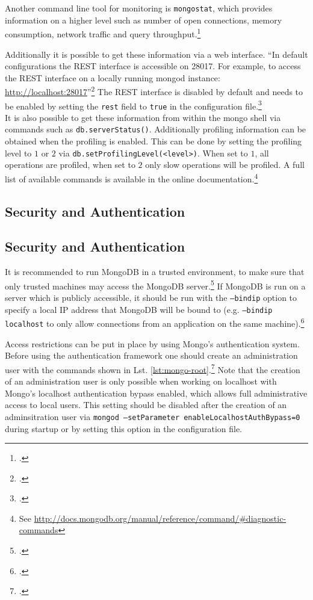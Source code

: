 Another command line tool for monitoring is \texttt{mongostat}, which provides
information on a higher level such as number of open connections,
memory consumption, network traffic and query throughput.\footcite[Cf.][]{mongo_monitoring}

Additionally it is possible to get these information via a web interface.
``In default configurations the REST interface is accessible on 28017. For
example, to access the REST interface on a locally running mongod instance:
\url{http://localhost:28017}''\footcite[][]{mongo_monitoring}
The REST interface is disabled by default and needs to be enabled by setting the
\texttt{rest} field to \texttt{true} in the configuration file.\footcite[Cf.][]{mongo_conf}\\
It is also possible to get these information from within the mongo shell via commands such as
\texttt{db.serverStatus()}. Additionally profiling information can be obtained when the
profiling is enabled. This can be done by setting the profiling level to $1$ or $2$ via
\texttt{db.setProfilingLevel(<level>)}. When set to $1$, all operations are profiled, when set
to $2$ only slow operations will be profiled.
A full list of available commands is available in the online
documentation.\footnote{See \url{http://docs.mongodb.org/manual/reference/command/\#diagnostic-commands}}


\subsection{Security and Authentication}
\subsection{Security and Authentication}
\label{sec:maintenance-security}
It is recommended to run MongoDB in a trusted environment, to make sure that
only trusted machines may access the MongoDB
server.\footcite[Cf.][118]{Chodorow_2010}
If MongoDB is run on a server which is publicly accessible, it should be
run with the \texttt{--bindip} option to specify a local IP address that MongoDB
will be bound to (e.g. \texttt{--bindip localhost} to only allow
connections from an application on the same
machine).\footcite[Cf.][118]{Chodorow_2010}

Access restrictions can be put in place by using Mongo's authentication system.
Before using the authentication framework one should
create an administration user with the commands shown in Lst.
\ref{lst:mongo-root}.\footcite[Cf.][]{mongo_adminuser} Note that the creation of
an administration user is only possible when working on localhost with Mongo's localhost authentication
bypass enabled, which allows full administrative access to local users.
This setting should be disabled after the creation of an adminsitration user via
\texttt{mongod --setParameter enableLocalhostAuthBypass=0} during startup or by
setting this option in the configuration file.

